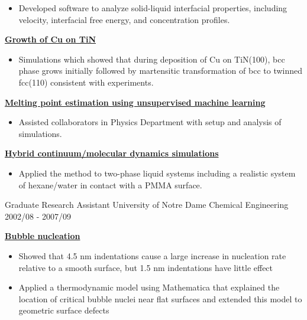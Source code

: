 \begin{cventries}
{\begin{cvitems}
\begin{itemize}
                    \item {Developed software to analyze solid-liquid interfacial properties, including velocity, interfacial free energy, and concentration profiles.}
                \end{itemize}
            \item {\textbf{\underline{Growth of Cu on TiN}}}
                \vspace{2pt}
                \begin{itemize}
                \item {Simulations which showed that during deposition of Cu on TiN(100), bcc phase grows initially followed by martensitic transformation of bcc to twinned fcc(110) consistent with experiments.}
                \end{itemize}
            \item {\textbf{\underline{Melting point estimation using unsupervised machine learning}}}
                \vspace{2pt}
                \begin{itemize}
                \item {Assisted collaborators in Physics Department with setup and analysis of simulations.}
                \end{itemize}
            \item {\textbf{\underline{Hybrid continuum/molecular dynamics simulations}}}
                \vspace{2pt}
                \begin{itemize}
                \item {Applied the method to two-phase liquid systems including a realistic system of hexane/water in contact with a PMMA surface.}
                \end{itemize}
        \end{cvitems}
    }

  \cventry
    {Graduate Research Assistant} %
    {University of Notre Dame} %
    {Chemical Engineering} %
    {2002/08 - 2007/09} %
    {
      \begin{cvitems} %
        \item {\textbf{\underline{Bubble nucleation}}}
            \begin{itemize}
                \item {Showed that 4.5 nm indentations cause a large increase in nucleation rate relative to a smooth surface, but 1.5 nm indentations have little effect}
                \item {Applied a thermodynamic model using Mathematica that explained the location of critical bubble nuclei near flat surfaces and extended this model to geometric surface defects}
            \end{itemize}
      \end{cvitems}
    }
    

\end{cventries}
